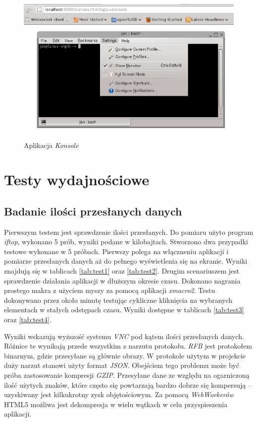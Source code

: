 \begin{figure}[!h]
  \centering
  \includegraphics[width=\textwidth,height=!]{img/konsole.png}
  \caption{Aplikacja \emph{Konsole}}
  \label{konsole}
\end{figure}

\section{Testy wydajnościowe}

\subsection{Badanie ilości przesłanych danych}

Pierwszym testem jest sprawdzenie ilości przesłanych. Do pomiaru użyto program \emph{iftop}, wykonano 5 prób, wyniki podane w kilobajtach.
Stworzono dwa przypadki testowe wykonane w 5 próbach. Pierwszy polega na włączneniu aplikacji i pomiarze przesłanych danych aż do pełnego wyświetlenia się na ekranie. Wyniki znajdują się w tablicach \ref{tab:test1} oraz \ref{tab:test2}. Drugim scenariuszem jest sprawdzenie działania aplikacji w dłuższym okresie czasu. Dokonano nagrania prostego makra z użyciem myszy za pomocą aplikacji \emph{xmacro2}. Testu dokonywano przez około minutę testując cykliczne kliknięcia na wybranych elementach w stałych odstępach czasu. Wyniki dostępne w tablicach \ref{tab:test3} oraz \ref{tab:test4}.

Wyniki wskazują wyższość systemu \emph{VNC} pod kątem ilości przesłanych danych. Różnice te wynikają przede wszystkim z narzutu protokołu. \emph{RFB} jest protokołem binarnym, gdzie przesyłane są głównie obrazy. W protokole użytym w projekcie duży narzut stanowi użyty format \emph{JSON}. Obejściem tego problemu może być próba zastosowanie kompresji \emph{GZIP}. Przesyłane dane ze względu na ogarniczoną ilość użytych znaków, które często się powtarzają bardzo dobrze się kompersują -- uzyskiwany jest kilkukrotny zysk objętościowym. Za pomocą \emph{WebWorkerów} HTML5 możliwa jest dekompresja w wielu wątkach w celu przyspieszenia aplikacji.

